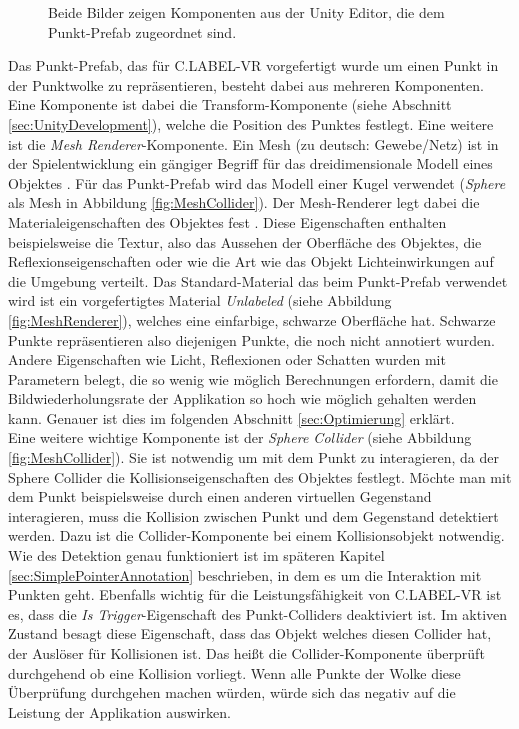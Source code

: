 \begin{figure}%
    \centering
    \qquad
    \caption{Beide Bilder zeigen Komponenten aus der Unity Editor, die dem Punkt-Prefab zugeordnet sind.}
    \label{fig:Components}%
\end{figure}

Das Punkt-Prefab, das für C.LABEL-VR vorgefertigt wurde um einen Punkt in der Punktwolke zu repräsentieren, besteht dabei aus mehreren Komponenten. Eine Komponente ist dabei die Transform-Komponente (siehe Abschnitt \ref{sec:UnityDevelopment}), welche die Position des Punktes festlegt. Eine weitere ist die \textit{Mesh Renderer}-Komponente. Ein Mesh (zu deutsch: Gewebe/Netz) ist in der Spielentwicklung ein gängiger Begriff für das dreidimensionale Modell eines Objektes \cite{bib:Meshes}. Für das Punkt-Prefab wird das Modell einer Kugel verwendet (\textit{Sphere} als Mesh in Abbildung \ref{fig:MeshCollider}). Der Mesh-Renderer legt dabei die Materialeigenschaften des Objektes fest \cite{bib:MeshRenderer}. Diese Eigenschaften enthalten beispielsweise die Textur, also das Aussehen der Oberfläche des Objektes, die Reflexionseigenschaften oder wie die Art wie das Objekt Lichteinwirkungen auf die Umgebung verteilt. Das Standard-Material das beim Punkt-Prefab verwendet wird ist ein vorgefertigtes Material \textit{Unlabeled} (siehe Abbildung \ref{fig:MeshRenderer}), welches eine einfarbige, schwarze Oberfläche hat. Schwarze Punkte repräsentieren also diejenigen Punkte, die noch nicht annotiert wurden. Andere Eigenschaften wie Licht, Reflexionen oder Schatten wurden mit Parametern belegt, die so wenig wie möglich Berechnungen erfordern, damit die Bildwiederholungsrate der Applikation so hoch wie möglich gehalten werden kann. Genauer ist dies im folgenden Abschnitt \ref{sec:Optimierung} erklärt. \\

Eine weitere wichtige Komponente ist der \textit{Sphere Collider} (siehe Abbildung \ref{fig:MeshCollider}). Sie ist notwendig um mit dem Punkt zu interagieren, da der Sphere Collider die Kollisionseigenschaften des Objektes festlegt. Möchte man mit dem Punkt beispielsweise durch einen anderen virtuellen Gegenstand interagieren, muss die Kollision zwischen Punkt und dem Gegenstand detektiert werden. Dazu ist die Collider-Komponente bei einem Kollisionsobjekt notwendig. Wie des Detektion genau funktioniert ist im späteren Kapitel \ref{sec:SimplePointerAnnotation} beschrieben, in dem es um die Interaktion mit Punkten geht. Ebenfalls wichtig für die Leistungsfähigkeit von C.LABEL-VR ist es, dass die \textit{Is Trigger}-Eigenschaft des Punkt-Colliders deaktiviert ist. Im aktiven Zustand besagt diese Eigenschaft, dass das Objekt welches diesen Collider hat, der Auslöser für Kollisionen ist. Das heißt die Collider-Komponente überprüft durchgehend ob eine Kollision vorliegt. Wenn alle Punkte der Wolke diese Überprüfung durchgehen machen würden, würde sich das negativ auf die Leistung der Applikation auswirken.\\

